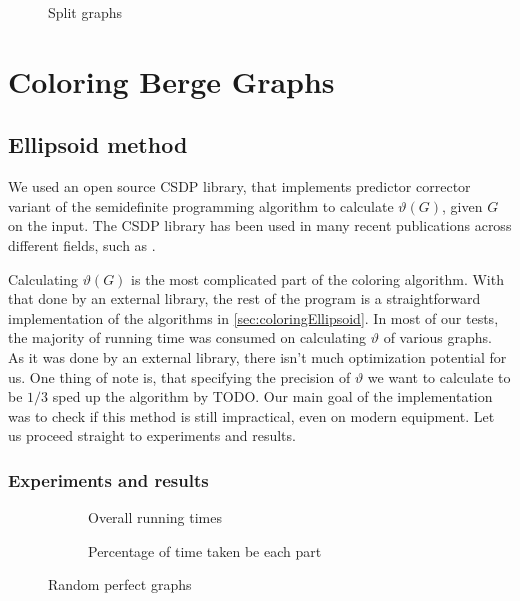 \begin{figure}
  \centering
  
  \label{plot:splitLines}
  \caption{Split graphs}
\end{figure}

\begin{figure}
  \centering
  
  \label{plot:splitLines}
  \caption{\the\textwidth \the\textheight}
\end{figure}


\pagebreak
\section{Coloring Berge Graphs}

\subsection{Ellipsoid method}

We used an open source CSDP \cite{csdpRepo, csdp1999} library, that implements predictor corrector variant of the semidefinite programming algorithm to calculate $\vartheta(G)$, given $G$ on the input. The CSDP library has been used in many recent publications across different fields, such as \cite{Ampountolas_2017, Adasme_2011}.


Calculating $\vartheta(G)$ is the most complicated part of the coloring algorithm. With that done by an external library, the rest of the program is a straightforward implementation of the algorithms in \cref{sec:coloringEllipsoid}. In most of our tests, the majority of running time was consumed on calculating $\vartheta$ of various graphs. As it was done by an external library, there isn't much optimization potential for us. One thing of note is, that specifying the precision of $\vartheta$ we want to calculate to be $1/3$ sped up the algorithm by TODO. Our main goal of the implementation was to check if this method is still impractical, even on modern equipment. Let us proceed straight to experiments and results.

\subsubsection{Experiments and results}

\begin{figure}
  \begin{subfigure}{.5\textwidth}
    \centering
    
    \caption{Overall running times}
  \end{subfigure}%
  \begin{subfigure}{.5\textwidth}
    \centering
    
    \caption{Percentage of time taken be each part}
  \end{subfigure}
  \caption{Random perfect graphs}
\end{figure}

